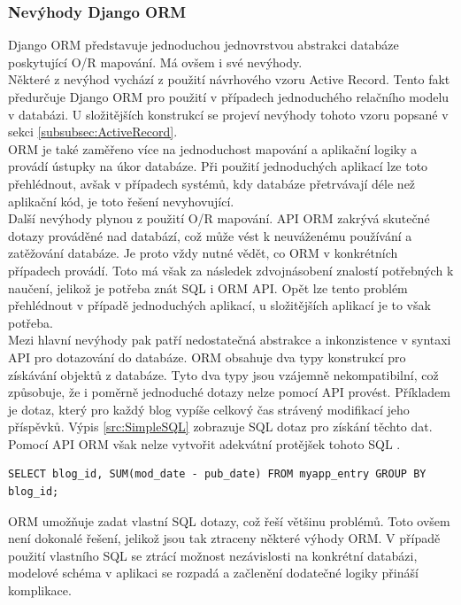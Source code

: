 \documentclass[ing,male,java,dept456]{diploma}						%
\begin{document}
\subsubsection{Nevýhody Django ORM}

Django ORM představuje jednoduchou jednovrstvou abstrakci databáze poskytující O/R mapování. Má ovšem i své nevýhody. \\
Některé z nevýhod vychází z použití návrhového vzoru Active Record. Tento fakt předurčuje Django ORM pro použití v případech jednoduchého relačního modelu v databázi. U složitějších konstrukcí se projeví nevýhody tohoto vzoru popsané v sekci \ref{subsubsec:ActiveRecord}. \\
ORM je také zaměřeno více na jednoduchost mapování a aplikační logiky a provádí ústupky na úkor databáze. Při použití jednoduchých aplikací lze toto přehlédnout, avšak v případech systémů, kdy databáze přetrvávají déle než aplikační kód, je toto řešení nevyhovující. \\
Další nevýhody plynou z použití O/R mapování. API ORM zakrývá skutečné dotazy prováděné nad databází, což může vést k neuváženému používání a zatěžování databáze. Je proto vždy nutné vědět, co ORM v konkrétních případech provádí. Toto má však za následek zdvojnásobení znalostí potřebných k naučení, jelikož je potřeba znát SQL i ORM API. Opět lze tento problém přehlédnout v případě jednoduchých aplikací, u složitějších aplikací je to však potřeba. \\
Mezi hlavní nevýhody pak patří nedostatečná abstrakce a inkonzistence v syntaxi API pro dotazování do databáze. ORM obsahuje dva typy konstrukcí pro získávání objektů z databáze. Tyto dva typy jsou vzájemně nekompatibilní, což způsobuje, že i poměrně jednoduché dotazy nelze pomocí API provést. Příkladem je dotaz, který pro každý blog vypíše celkový čas strávený modifikací jeho příspěvků. Výpis \ref{src:SimpleSQL} zobrazuje SQL dotaz pro získání těchto dat. Pomocí API ORM však nelze vytvořit adekvátní protějšek tohoto SQL \cite{dj-dis}.
\begin{lstlisting}[style=customsql, label=src:SimpleSQL, caption={Příklad dotazu, který nelze provést pomocí Django ORM API}]
SELECT blog_id, SUM(mod_date - pub_date) FROM myapp_entry GROUP BY blog_id;
\end{lstlisting}

ORM umožňuje zadat vlastní SQL dotazy, což řeší většinu problémů. Toto ovšem není dokonalé řešení, jelikož jsou tak ztraceny některé výhody ORM. V případě použití vlastního SQL se ztrácí možnost nezávislosti na konkrétní databázi, modelové schéma v aplikaci se rozpadá a začlenění dodatečné logiky přináší komplikace. \\
\end{document}
